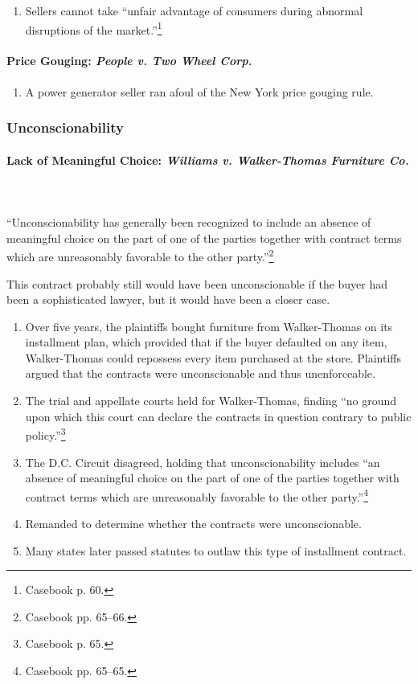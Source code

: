 \begin{enumerate}
    \item Sellers cannot take ``unfair advantage of consumers during abnormal 
    disruptions of the market.''\footnote{Casebook p. 60.}
\end{enumerate}

\paragraph{Price Gouging: \emph{People v. Two Wheel Corp.}}

\begin{enumerate}
    \item A power generator seller ran afoul of the New York price gouging 
    rule.
\end{enumerate}

\subsubsection{Unconscionability}

\paragraph{Lack of Meaningful Choice: \emph{Williams v. Walker-Thomas 
Furniture Co.}}
~\\\\
``Unconscionability has generally been recognized to include an absence of 
meaningful choice on the part of one of the parties together with contract 
terms which are unreasonably favorable to the other party.''\footnote{Casebook 
pp. 65--66.}

This contract probably still would have been unconscionable if the buyer had 
been a sophisticated lawyer, but it would have been a closer case. 
\begin{enumerate}
    \item Over five years, the plaintiffs bought furniture from Walker-Thomas 
    on its installment plan, which provided that if the buyer defaulted on any 
    item, Walker-Thomas could repossess every item purchased at the store. 
    Plaintiffs argued that the contracts were unconscionable and thus 
    unenforceable.
    \item The trial and appellate courts held for Walker-Thomas, finding ``no 
    ground upon which this court can declare the contracts in question 
    contrary to public policy.''\footnote{Casebook p. 65.}
    \item The D.C. Circuit disagreed, holding that unconscionability includes 
    ``an absence of meaningful choice on the part of one of the parties 
    together with contract terms which are unreasonably favorable to the other 
    party.''\footnote{Casebook pp. 65--65.}
    \item Remanded to determine whether the contracts were unconscionable.
    \item Many states later passed statutes to outlaw this type of installment 
    contract.
\end{enumerate}
 
